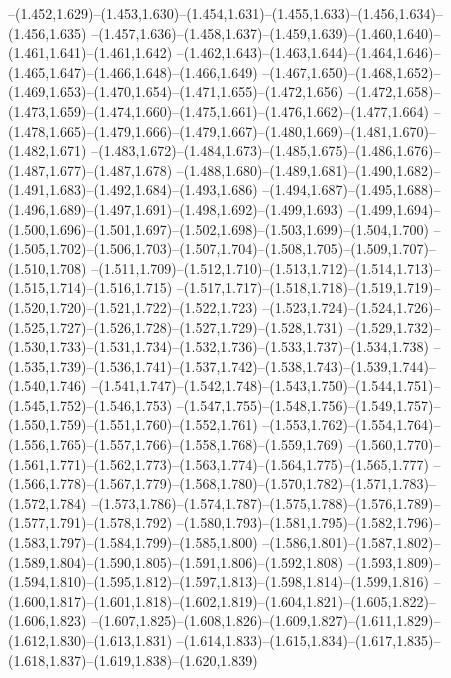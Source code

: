   --(1.452,1.629)--(1.453,1.630)--(1.454,1.631)--(1.455,1.633)--(1.456,1.634)--(1.456,1.635)%
  --(1.457,1.636)--(1.458,1.637)--(1.459,1.639)--(1.460,1.640)--(1.461,1.641)--(1.461,1.642)%
  --(1.462,1.643)--(1.463,1.644)--(1.464,1.646)--(1.465,1.647)--(1.466,1.648)--(1.466,1.649)%
  --(1.467,1.650)--(1.468,1.652)--(1.469,1.653)--(1.470,1.654)--(1.471,1.655)--(1.472,1.656)%
  --(1.472,1.658)--(1.473,1.659)--(1.474,1.660)--(1.475,1.661)--(1.476,1.662)--(1.477,1.664)%
  --(1.478,1.665)--(1.479,1.666)--(1.479,1.667)--(1.480,1.669)--(1.481,1.670)--(1.482,1.671)%
  --(1.483,1.672)--(1.484,1.673)--(1.485,1.675)--(1.486,1.676)--(1.487,1.677)--(1.487,1.678)%
  --(1.488,1.680)--(1.489,1.681)--(1.490,1.682)--(1.491,1.683)--(1.492,1.684)--(1.493,1.686)%
  --(1.494,1.687)--(1.495,1.688)--(1.496,1.689)--(1.497,1.691)--(1.498,1.692)--(1.499,1.693)%
  --(1.499,1.694)--(1.500,1.696)--(1.501,1.697)--(1.502,1.698)--(1.503,1.699)--(1.504,1.700)%
  --(1.505,1.702)--(1.506,1.703)--(1.507,1.704)--(1.508,1.705)--(1.509,1.707)--(1.510,1.708)%
  --(1.511,1.709)--(1.512,1.710)--(1.513,1.712)--(1.514,1.713)--(1.515,1.714)--(1.516,1.715)%
  --(1.517,1.717)--(1.518,1.718)--(1.519,1.719)--(1.520,1.720)--(1.521,1.722)--(1.522,1.723)%
  --(1.523,1.724)--(1.524,1.726)--(1.525,1.727)--(1.526,1.728)--(1.527,1.729)--(1.528,1.731)%
  --(1.529,1.732)--(1.530,1.733)--(1.531,1.734)--(1.532,1.736)--(1.533,1.737)--(1.534,1.738)%
  --(1.535,1.739)--(1.536,1.741)--(1.537,1.742)--(1.538,1.743)--(1.539,1.744)--(1.540,1.746)%
  --(1.541,1.747)--(1.542,1.748)--(1.543,1.750)--(1.544,1.751)--(1.545,1.752)--(1.546,1.753)%
  --(1.547,1.755)--(1.548,1.756)--(1.549,1.757)--(1.550,1.759)--(1.551,1.760)--(1.552,1.761)%
  --(1.553,1.762)--(1.554,1.764)--(1.556,1.765)--(1.557,1.766)--(1.558,1.768)--(1.559,1.769)%
  --(1.560,1.770)--(1.561,1.771)--(1.562,1.773)--(1.563,1.774)--(1.564,1.775)--(1.565,1.777)%
  --(1.566,1.778)--(1.567,1.779)--(1.568,1.780)--(1.570,1.782)--(1.571,1.783)--(1.572,1.784)%
  --(1.573,1.786)--(1.574,1.787)--(1.575,1.788)--(1.576,1.789)--(1.577,1.791)--(1.578,1.792)%
  --(1.580,1.793)--(1.581,1.795)--(1.582,1.796)--(1.583,1.797)--(1.584,1.799)--(1.585,1.800)%
  --(1.586,1.801)--(1.587,1.802)--(1.589,1.804)--(1.590,1.805)--(1.591,1.806)--(1.592,1.808)%
  --(1.593,1.809)--(1.594,1.810)--(1.595,1.812)--(1.597,1.813)--(1.598,1.814)--(1.599,1.816)%
  --(1.600,1.817)--(1.601,1.818)--(1.602,1.819)--(1.604,1.821)--(1.605,1.822)--(1.606,1.823)%
  --(1.607,1.825)--(1.608,1.826)--(1.609,1.827)--(1.611,1.829)--(1.612,1.830)--(1.613,1.831)%
  --(1.614,1.833)--(1.615,1.834)--(1.617,1.835)--(1.618,1.837)--(1.619,1.838)--(1.620,1.839)%
